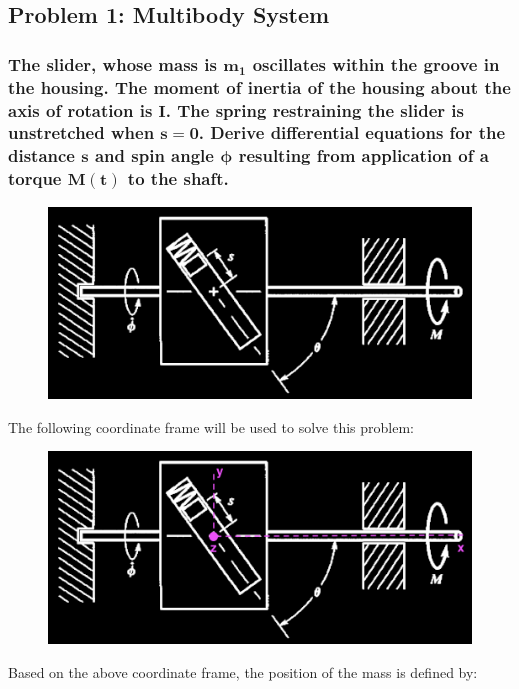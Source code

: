 \documentclass[12pt, letterpaper]{../assignment}
\begin{document}
\subsection*{Problem 1: Multibody System}
\subsubsection*{The slider,
whose mass is $\bm{m_1}$ oscillates within the groove in the housing.
The moment of inertia of the housing about the axis of rotation is $\bm{I}$.
The spring restraining the slider is unstretched when $\bm{s = 0}$.
Derive differential equations for the distance $\bm{s}$ and spin angle $\bm{\phi}$ resulting from application of a torque $\bm{M(t)}$ to the shaft.}

\begin{figure}[H]
    \centering
    \includegraphics[scale=0.5,frame]{images/Problem_1.png}
\end{figure}

The following coordinate frame will be used to solve this problem:

\begin{figure}[H]
    \centering
    \includegraphics[scale=0.5,frame]{images/Problem_1_cf.png}
\end{figure}

Based on the above coordinate frame, the position of the mass is defined by:
\end{document}
